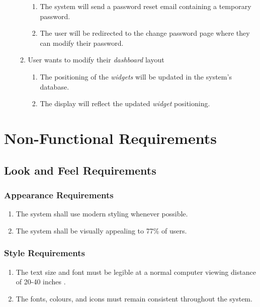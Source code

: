 \documentclass{article}
\begin{document}
\begin{enumerate}[{VP}1]
\begin{enumerate}[{BE}1]
		\begin{enumerate}
			\item The system will send a password reset email containing a temporary password.
			\item The user will be redirected to the change password page where they can modify their password.
		\end{enumerate}
		\item User wants to modify their \textit{dashboard} layout
		\begin{enumerate}
			\item The positioning of the \textit{widgets} will be updated in the system's database.
			\item The display will reflect the updated \textit{widget} positioning.
		\end{enumerate}
    \end{enumerate}
\end{enumerate}


\section{Non-Functional Requirements}
\label{sec:non-functional_requirements}
\subsection{Look and Feel Requirements}
\label{sub:look_and_feel_requirements}

\subsubsection{Appearance Requirements}
\label{ssub:appearance_requirements}
\begin{enumerate}[{LF}1. ]
    \item The system shall use modern styling whenever possible.
    \item The system shall be visually appealing to 77\% of users.
\end{enumerate}

\subsubsection{Style Requirements}
\label{ssub:style_requirements}
\begin{enumerate}[{LF}1. ]
	\item The text size and font must be legible at a normal computer viewing distance of 20-40 inches \cite{Viewing}.
	\item The fonts, colours, and icons must remain consistent throughout the system.
\end{enumerate}
\end{document}
